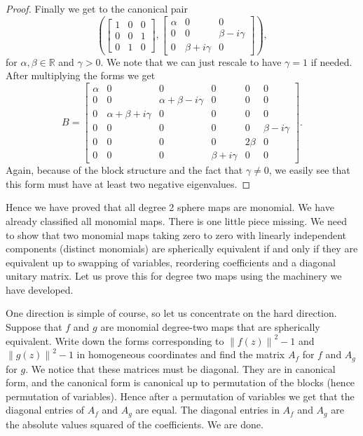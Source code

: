 \documentclass[12pt,openany]{book}
\newcommand{\norm}[1]{\left\lVert {#1} \right\rVert}
\newcommand{\R}{{\mathbb{R}}}
\theoremstyle{plain}
\theoremstyle{remark}
\theoremstyle{definition}
\theoremstyle{exercise}
\theoremstyle{example}
\begin{document}
\begin{proof}
Finally we get to the canonical pair
\begin{equation}
\left(
\begin{bmatrix}
       1 &        0 &        0\\
       0 &        0 &        1\\
       0 &        1 &        0
\end{bmatrix}
,
\begin{bmatrix}
  \alpha &        0 &        0\\
       0 &        0 & \beta-i\gamma\\
       0 & \beta+i\gamma &        0
\end{bmatrix}
\right) ,
\end{equation}
for $\alpha, \beta \in \R$ and $\gamma > 0$.
We note that we can just rescale to have $\gamma = 1$
if needed.
After multiplying the forms we get
\begin{equation} \label{form3B}
B = \begin{bmatrix}
  \alpha &        0 &        0 &        0 &        0 &        0\\
       0 &        0 & \alpha+\beta-i\gamma &        0 &        0 &        0\\
       0 & \alpha+\beta+i\gamma &        0 &        0 &        0 &        0\\
       0 &        0 &        0 &        0 &        0 & \beta-i\gamma\\
       0 &        0 &        0 &        0 & 2\beta &        0\\
       0 &        0 &        0 & \beta+i\gamma &        0 &        0
\end{bmatrix} .
\end{equation}
Again, because of the block structure and the fact that $\gamma \not= 0$,
we easily see that this form must have at least two negative eigenvalues.
\end{proof}

Hence we have proved that all degree 2 sphere maps are monomial.
We have already classified all monomial maps.
There is one little piece missing.  We need to show that two monomial maps
taking zero to zero
with linearly independent components (distinct monomials)
are
spherically equivalent if and only if they are equivalent up to swapping of
variables, reordering coefficients and a diagonal unitary matrix.
Let us prove this for degree two maps
using the machinery we have developed.

One direction is simple of course, so let us concentrate on the hard
direction.  Suppose that $f$ and $g$ are monomial degree-two maps
that are spherically equivalent.
Write down the forms corresponding to
$\norm{f(z)}^2 - 1$ and $\norm{g(z)}^2 - 1$ in homogeneous coordinates
and find the matrix $A_f$ for $f$ and $A_g$ for $g$.  We notice
that these matrices must be diagonal.  They are in canonical form,
and the canonical form is canonical up to permutation of the blocks (hence
permutation of variables).  Hence after a permutation of variables
we get that the diagonal entries of $A_f$ and $A_g$ are equal.
The diagonal entries in $A_f$ and $A_g$ are the absolute values squared
of the coefficients.  We are done.
\end{document}
